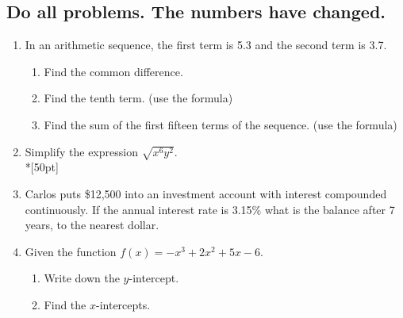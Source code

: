 \documentclass[12pt, oneside]{article}
\begin{document}
\subsection*{Do all problems. The numbers have changed.}

\vspace{1cm}

\begin{enumerate}


\item In an arithmetic sequence, the first term is 5.3 and the second term is 3.7.
\begin{enumerate}
    \item Find the common difference.
        \begin{flushright}[2]\end{flushright}
    \item Find the tenth term. (use the formula)\\[50pt]
        \begin{flushright}[2]\end{flushright}
    \item Find the sum of the first fifteen terms of the sequence. (use the formula)\\[50pt]
        \begin{flushright}[2]\end{flushright}
\end{enumerate}

\item Simplify the expression $\sqrt{x^6 y^2}$.\\*[50pt]
        \begin{flushright}[2]\end{flushright}

\item Carlos puts \$12,500 into an investment account with interest compounded continuously. If the annual interest rate is 3.15\% what is the balance after 7 years, to the nearest dollar. %
        \begin{flushright}[5]\end{flushright}

\newpage
\item Given the function $f(x)=-x^3+2x^2+5x-6$. 
\begin{enumerate}
    \item Write down the $y$-intercept.
        \begin{flushright}[1]\end{flushright}%
    \item Find the $x$-intercepts.%
        \begin{flushright}[2]\end{flushright}


\end{enumerate}
\end{enumerate}
\end{document}
